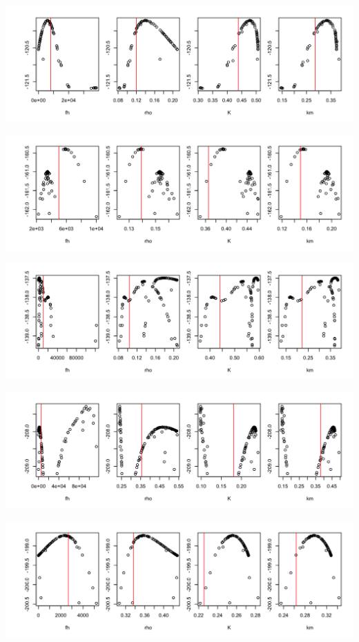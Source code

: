 \documentclass[12pt,reqno,final,pdftex]{amsart}\usepackage[]{graphicx}\usepackage[]{color}
\newenvironment{knitrout}{}{} %
\theoremstyle{plain}
\numberwithin{equation}{part}
\begin{document}
\begin{knitrout}
\includegraphics[width=\linewidth]{figure/unnamed-chunk-4-15} \hfill{}




\includegraphics[width=\linewidth]{figure/unnamed-chunk-4-16} \hfill{}




\includegraphics[width=\linewidth]{figure/unnamed-chunk-4-17} \hfill{}




\includegraphics[width=\linewidth]{figure/unnamed-chunk-4-18} \hfill{}




\includegraphics[width=\linewidth]{figure/unnamed-chunk-4-19} \hfill{}





\end{knitrout}
\end{document}
